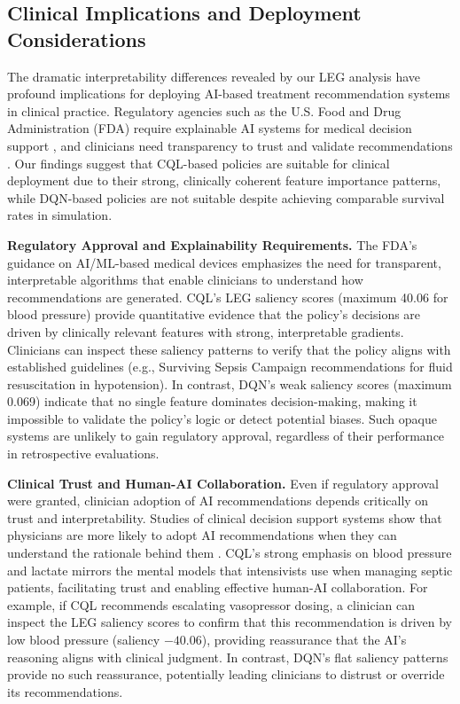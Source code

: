 \subsection{Clinical Implications and Deployment Considerations}\label{sec:discussion:clinical}

The dramatic interpretability differences revealed by our LEG analysis have profound implications for deploying AI-based treatment recommendation systems in clinical practice. Regulatory agencies such as the U.S. Food and Drug Administration (FDA) require explainable AI systems for medical decision support \citep{holzinger2017xai_healthcare}, and clinicians need transparency to trust and validate recommendations \citep{gottesman2019guidelines}. Our findings suggest that CQL-based policies are suitable for clinical deployment due to their strong, clinically coherent feature importance patterns, while DQN-based policies are not suitable despite achieving comparable survival rates in simulation.

\textbf{Regulatory Approval and Explainability Requirements.} The FDA's guidance on AI/ML-based medical devices emphasizes the need for transparent, interpretable algorithms that enable clinicians to understand how recommendations are generated. CQL's LEG saliency scores (maximum 40.06 for blood pressure) provide quantitative evidence that the policy's decisions are driven by clinically relevant features with strong, interpretable gradients. Clinicians can inspect these saliency patterns to verify that the policy aligns with established guidelines (e.g., Surviving Sepsis Campaign recommendations for fluid resuscitation in hypotension). In contrast, DQN's weak saliency scores (maximum 0.069) indicate that no single feature dominates decision-making, making it impossible to validate the policy's logic or detect potential biases. Such opaque systems are unlikely to gain regulatory approval, regardless of their performance in retrospective evaluations.

\textbf{Clinical Trust and Human-AI Collaboration.} Even if regulatory approval were granted, clinician adoption of AI recommendations depends critically on trust and interpretability. Studies of clinical decision support systems show that physicians are more likely to adopt AI recommendations when they can understand the rationale behind them \citep{shortliffe2018cdss}. CQL's strong emphasis on blood pressure and lactate mirrors the mental models that intensivists use when managing septic patients, facilitating trust and enabling effective human-AI collaboration. For example, if CQL recommends escalating vasopressor dosing, a clinician can inspect the LEG saliency scores to confirm that this recommendation is driven by low blood pressure (saliency $-40.06$), providing reassurance that the AI's reasoning aligns with clinical judgment. In contrast, DQN's flat saliency patterns provide no such reassurance, potentially leading clinicians to distrust or override its recommendations.

